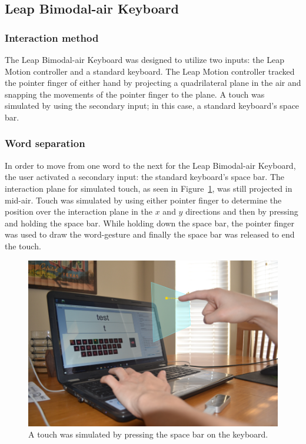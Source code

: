 \subsection{Leap Bimodal-air Keyboard}
\subsubsection{Interaction method}
The Leap Bimodal-air Keyboard was designed to utilize two inputs: the Leap Motion controller and a standard keyboard. The Leap Motion controller tracked the pointer finger of either hand by projecting a quadrilateral plane in the air and snapping the movements of the pointer finger to the plane. A touch was simulated by using the secondary input; in this case, a standard keyboard's space bar.

\subsubsection{Word separation}
In order to move from one word to the next for the Leap Bimodal-air Keyboard, the user activated a secondary input: the standard keyboard's space bar. The interaction plane for simulated touch, as seen in Figure~\ref{bimodal_press}, was still projected in mid-air. Touch was simulated by using either pointer finger to determine the position over the interaction plane in the $x$ and $y$ directions and then by pressing and holding the space bar. While holding down the space bar, the pointer finger was used to draw the word-gesture and finally the space bar was released to end the touch.

\begin{figure}[!t]
	\centering
	\includegraphics[width=5in]{Figures/fig_leap_bimodal}
	\caption[Leap Bimodal-air Word-separation]{A touch was simulated by pressing the space bar on the keyboard.}
	\label{bimodal_press}
\end{figure}

